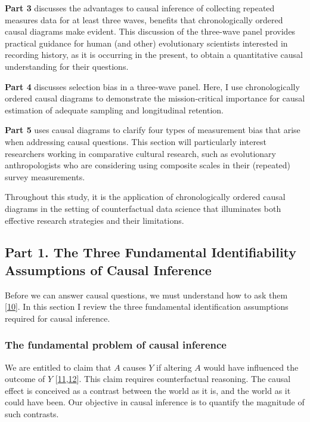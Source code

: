 \documentclass[
  singlecolumn]{article}
\begin{document}
\textbf{Part 3} discusses the advantages to causal inference of
collecting repeated measures data for at least three waves, benefits
that chronologically ordered causal diagrams make evident. This
discussion of the three-wave panel provides practical guidance for human
(and other) evolutionary scientists interested in recording history, as
it is occurring in the present, to obtain a quantitative causal
understanding for their questions.

\textbf{Part 4} discusses selection bias in a three-wave panel. Here, I
use chronologically ordered causal diagrams to demonstrate the
mission-critical importance for causal estimation of adequate sampling
and longitudinal retention.

\textbf{Part 5} uses causal diagrams to clarify four types of
measurement bias that arise when addressing causal questions. This
section will particularly interest researchers working in comparative
cultural research, such as evolutionary anthropologists who are
considering using composite scales in their (repeated) survey
measurements.

Throughout this study, it is the application of chronologically ordered
causal diagrams in the setting of counterfactual data science that
illuminates both effective research strategies and their limitations.

\hypertarget{part-1.-the-three-fundamental-identifiability-assumptions-of-causal-inference}{%
\subsection{Part 1. The Three Fundamental Identifiability Assumptions of
Causal
Inference}\label{part-1.-the-three-fundamental-identifiability-assumptions-of-causal-inference}}

Before we can answer causal questions, we must understand how to ask
them {[}\protect\hyperlink{ref-hernuxe1n2016}{10}{]}. In this section I
review the three fundamental identification assumptions required for
causal inference.

\hypertarget{the-fundamental-problem-of-causal-inference}{%
\subsubsection{The fundamental problem of causal
inference}\label{the-fundamental-problem-of-causal-inference}}

We are entitled to claim that \(A\) causes \(Y\) if altering \(A\) would
have influenced the outcome of \(Y\)
{[}\protect\hyperlink{ref-hume1902}{11},\protect\hyperlink{ref-lewis1973}{12}{]}.
This claim requires counterfactual reasoning. The causal effect is
conceived as a contrast between the world as it is, and the world as it
could have been. Our objective in causal inference is to quantify the
magnitude of such contrasts.
\end{document}
